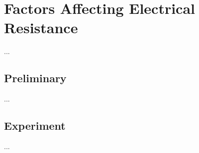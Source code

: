 \chapter{Factors Affecting Electrical Resistance}
...
\section{Preliminary}
...
\section{Experiment}
...
